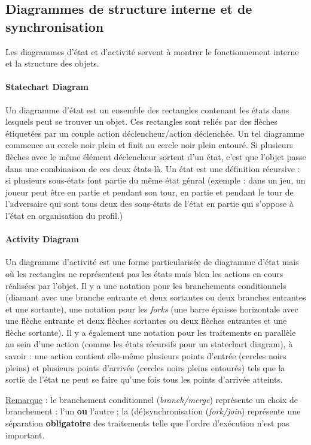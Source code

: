 \documentclass{article}
\begin{document}
	\subsection{Diagrammes de structure interne et de synchronisation}
		Les diagrammes d'état et d'activité servent à montrer le fonctionnement interne et la structure des objets.

		\paragraph{Statechart Diagram} Un diagramme d'état est un ensemble des rectangles contenant les états dans lesquels peut se trouver un objet. Ces rectangles sont reliés par des flèches
		étiquetées par un couple action déclencheur/action déclenchée. Un tel diagramme commence au cercle noir plein et finit au cercle noir plein entouré. Si plusieurs flèches avec le même élément
		déclencheur sortent d'un état, c'est que l'objet passe dans une combinaison de ces deux états-là. Un état est une définition récursive : si plusieurs sous-états font partie du même état génral
		(exemple : dans un jeu, un joueur peut être en partie et pendant son tour, en partie et pendant le tour de l'adversaire qui sont tous deux des sous-états de l'état en partie qui s'oppose à
		l'état en organisation du profil.)

		\paragraph{Activity Diagram} Un diagramme d'activité est une forme particularisée de diagramme d'état mais où les rectangles ne représentent pas les états mais bien les actions en cours
		réalisées par l'objet. Il y a une notation pour les branchements conditionnels (diamant avec une branche entrante et deux sortantes ou deux branches entrantes et une sortante), une notation
		pour les \textit{forks} (une barre épaisse horizontale avec une flèche entrante et deux flèches sortantes ou deux flèches entrantes et une flèche sortante). Il y a également une notation
		pour les traitements en parallèle au sein d'une action (comme les états récursifs pour un statechart diagram), à savoir : une action contient elle-même plusieurs points d'entrée
		(cercles noirs pleins) et plusieurs points d'arrivée (cercles noirs pleins entourés) tels que la sortie de l'état ne peut se faire qu'une fois tous les points d'arrivée atteints.

		\underline{Remarque} : le branchement conditionnel (\textit{branch/merge}) représente un choix de branchement : l'un \textbf{ou} l'autre ; la (dé)synchronisation (\textit{fork/join})
		représente une séparation \textbf{obligatoire} des traitements telle que l'ordre d'exécution n'est pas important.
	
\end{document}
